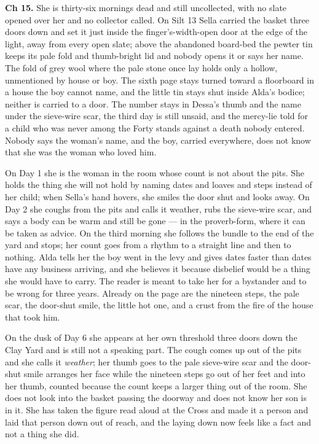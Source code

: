 \documentclass{design/chronicle}
\begin{document}
{\textbf{Ch 15.} She is thirty-six mornings dead and still uncollected, with no slate opened over her and no collector called. On Silt 13 Sella carried the basket three doors down and set it just inside the finger’s-width-open door at the edge of the light, away from every open slate; above the abandoned board-bed the pewter tin keeps its pale fold and thumb-bright lid and nobody opens it or says her name. The fold of grey wool where the pale stone once lay holds only a hollow, unmentioned by house or boy. The sixth page stays turned toward a floorboard in a house the boy cannot name, and the little tin stays shut inside Alda’s bodice; neither is carried to a door. The number stays in Dessa’s thumb and the name under the sieve-wire scar, the third day is still unsaid, and the mercy-lie told for a child who was never among the Forty stands against a death nobody entered. Nobody says the woman’s name, and the boy, carried everywhere, does not know that she was the woman who loved him.

On Day 1 she is the woman in the room whose count is not about the pits. She holds the thing she will not hold by naming dates and loaves and steps instead of her child; when Sella’s hand hovers, she smiles the door shut and looks away. On Day 2 she coughs from the pits and calls it weather, rubs the sieve-wire scar, and says a body can be warm and still be gone --- in the proverb-form, where it can be taken as advice. On the third morning she follows the bundle to the end of the yard and stops; her count goes from a rhythm to a straight line and then to nothing. Alda tells her the boy went in the levy and gives dates faster than dates have any business arriving, and she believes it because disbelief would be a thing she would have to carry. The reader is meant to take her for a bystander and to be wrong for three years. Already on the page are the nineteen steps, the pale scar, the door-shut smile, the little hot one, and a crust from the fire of the house that took him.

On the dusk of Day 6 she appears at her own threshold three doors down the Clay Yard and is still not a speaking part. The cough comes up out of the pits and she calls it \emph{weather}; her thumb goes to the pale sieve-wire scar and the door-shut smile arranges her face while the nineteen steps go out of her feet and into her thumb, counted because the count keeps a larger thing out of the room. She does not look into the basket passing the doorway and does not know her son is in it. She has taken the figure read aloud at the Cross and made it a person and laid that person down out of reach, and the laying down now feels like a fact and not a thing she did.

}
\end{document}
